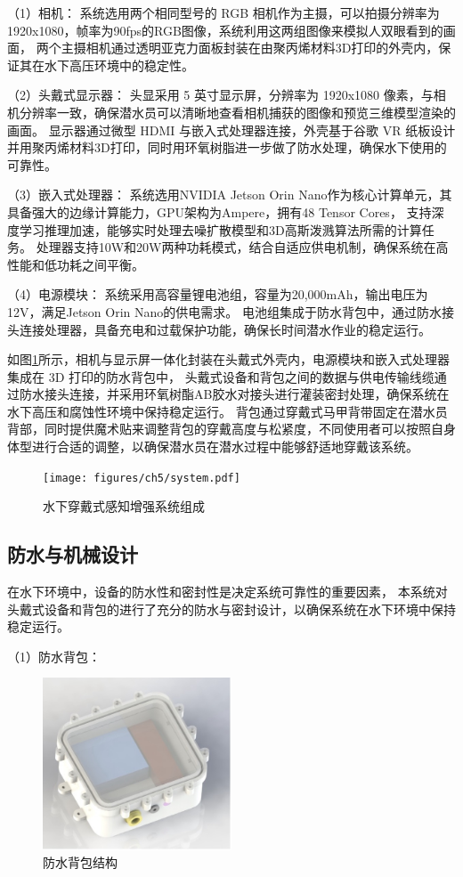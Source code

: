 （1）相机：
系统选用两个相同型号的 RGB 相机作为主摄，可以拍摄分辨率为1920x1080，帧率为90fps的RGB图像，系统利用这两组图像来模拟人双眼看到的画面，
两个主摄相机通过透明亚克力面板封装在由聚丙烯材料3D打印的外壳内，保证其在水下高压环境中的稳定性。

（2）头戴式显示器：
头显采用 5 英寸显示屏，分辨率为 1920x1080 像素，与相机分辨率一致，确保潜水员可以清晰地查看相机捕获的图像和预览三维模型渲染的画面。
显示器通过微型 HDMI 与嵌入式处理器连接，外壳基于谷歌 VR 纸板设计并用聚丙烯材料3D打印，同时用环氧树脂进一步做了防水处理，确保水下使用的可靠性。

（3）嵌入式处理器：
系统选用NVIDIA Jetson Orin Nano作为核心计算单元，其具备强大的边缘计算能力，GPU架构为Ampere，拥有48 Tensor Cores，
支持深度学习推理加速，能够实时处理去噪扩散模型和3D高斯泼溅算法所需的计算任务。
处理器支持10W和20W两种功耗模式，结合自适应供电机制，确保系统在高性能和低功耗之间平衡。

（4）电源模块：
系统采用高容量锂电池组，容量为20,000mAh，输出电压为12V，满足Jetson Orin Nano的供电需求。
电池组集成于防水背包中，通过防水接头连接处理器，具备充电和过载保护功能，确保长时间潜水作业的稳定运行。

如图\ref{img:system}所示，相机与显示屏一体化封装在头戴式外壳内，电源模块和嵌入式处理器集成在 3D 打印的防水背包中，
头戴式设备和背包之间的数据与供电传输线缆通过防水接头连接，并采用环氧树酯AB胶水对接头进行灌装密封处理，确保系统在水下高压和腐蚀性环境中保持稳定运行。
背包通过穿戴式马甲背带固定在潜水员背部，同时提供魔术贴来调整背包的穿戴高度与松紧度，不同使用者可以按照自身体型进行合适的调整，以确保潜水员在潜水过程中能够舒适地穿戴该系统。

\begin{figure}
    \vspace{4mm}
    \centering
    \texttt{[image: figures/ch5/system.pdf]}
    \caption{水下穿戴式感知增强系统组成}
    \label{img:system}
\end{figure}

\subsection{防水与机械设计}
在水下环境中，设备的防水性和密封性是决定系统可靠性的重要因素，
本系统对头戴式设备和背包的进行了充分的防水与密封设计，以确保系统在水下环境中保持稳定运行。

（1）防水背包：
\begin{figure}[h]
    \centering
    \includegraphics[width=0.5\textwidth]{figures/ch5/bag.jpg}
    \caption{防水背包结构}
    \label{img:bag}
\end{figure}

